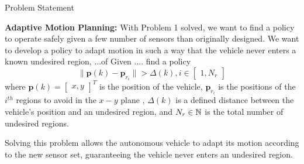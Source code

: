 \begin{section}{Problem Statement}
\begin{problem} \label{problem2} {\textbf{Adaptive Motion Planning:}}
With Problem 1 solved, we want to find a policy to operate safely given a few number of sensors than originally designed. We want to develop a policy to adapt motion in such a way that the vehicle never enters a known undesired region, ...of Given .... find a policy
	\begin{equation}
		\lVert {\bm{p}(k)-\bm{p}_{r_i}} \rVert >\Delta(k),  i \in \begin{bmatrix} 1,N_r \end{bmatrix}
	\end{equation}
where $\bm{p}(k)={\begin{bmatrix} x,y \end{bmatrix}}^T$ is the position of the vehicle, $\bm{p}_{r_i}$ is the positions of the ${i}^{th}$ regions to avoid in the $x-y$ plane , $\Delta(k)$ is a defined distance between the vehicle's position and an undesired region, and $N_r \in \mathbb{N}$ is the total number of undesired regions. 
\end{problem}

Solving this problem allows the autonomous vehicle to adapt its motion according to the new sensor set, guaranteeing the vehicle never enters an undesired region.

\end{section}